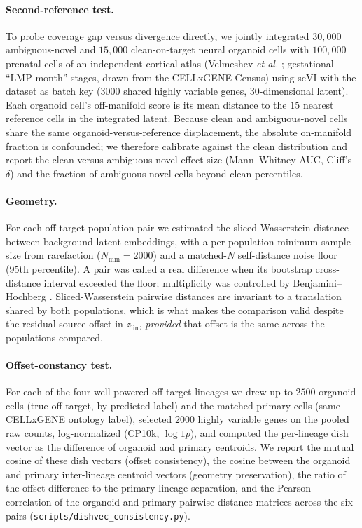\documentclass[11pt]{article}
\newcommand{\zlin}{\ensuremath{z_{\mathrm{lin}}}}
\begin{document}
\paragraph{Second-reference test.} To probe coverage gap versus divergence directly, we jointly
integrated $30{,}000$ ambiguous-novel and $15{,}000$ clean-on-target neural organoid cells with
$100{,}000$ prenatal cells of an independent cortical atlas (Velmeshev \emph{et al.}
\citep{velmeshev2023cortex}; gestational ``LMP-month'' stages, drawn from the CELLxGENE Census) using
scVI with the dataset as batch key ($3000$ shared highly variable genes, $30$-dimensional latent). Each
organoid cell's off-manifold score is its mean distance to the $15$ nearest reference cells in the
integrated latent. Because clean and ambiguous-novel cells share the same organoid-versus-reference
displacement, the absolute on-manifold fraction is confounded; we therefore calibrate against the clean
distribution and report the clean-versus-ambiguous-novel effect size (Mann--Whitney AUC, Cliff's
$\delta$) and the fraction of ambiguous-novel cells beyond clean percentiles.

\paragraph{Geometry.} For each off-target population pair we estimated the sliced-Wasserstein distance
\citep{bonneel2015sliced} between background-latent embeddings, with a per-population minimum sample
size from rarefaction ($N_{\min}=2000$) and a matched-$N$ self-distance noise floor (95th percentile).
A pair was called a real difference when its bootstrap cross-distance interval exceeded the floor;
multiplicity was controlled by Benjamini--Hochberg \citep{benjamini1995fdr}. Sliced-Wasserstein
pairwise distances are invariant to a translation shared by both populations, which is what makes the
comparison valid despite the residual source offset in \zlin, \emph{provided} that offset is the same
across the populations compared.

\paragraph{Offset-constancy test.} For each of the four well-powered off-target lineages we drew up to
$2500$ organoid cells (true-off-target, by predicted label) and the matched primary cells (same
CELLxGENE ontology label), selected $2000$ highly variable genes on the pooled raw counts, log-normalized
(CP10k, $\log1p$), and computed the per-lineage dish vector as the difference of organoid and primary
centroids. We report the mutual cosine of these dish vectors (offset consistency), the cosine between the
organoid and primary inter-lineage centroid vectors (geometry preservation), the ratio of the offset
difference to the primary lineage separation, and the Pearson correlation of the organoid and primary
pairwise-distance matrices across the six pairs (\texttt{scripts/dishvec\_consistency.py}).
\end{document}
